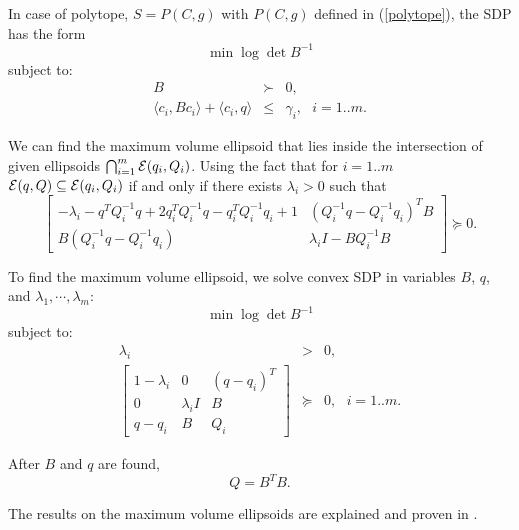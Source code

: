 In case of polytope, $S=P(C,g)$ with $P(C,g)$ defined in (\ref{polytope}),
the SDP has the form
\[ \min \log \det B^{-1} \]
subject to:
\begin{eqnarray*}
B & \succ & 0,\\
\langle c_i, Bc_i\rangle + \langle c_i, q\rangle & \leq & \gamma_i,
~~~ i=1..m.
\end{eqnarray*}

We can find the maximum volume ellipsoid that lies inside the intersection
of given ellipsoids $\bigcap_{i=1}^m\EE(q_i,Q_i)$.
Using the fact that for $i=1..m$ $\EE(q,Q)\subseteq\EE(q_i,Q_i)$ if and only
if there exists $\lambda_i>0$ such that
\[
\left[\begin{array}{cc}
-\lambda_i - q^TQ_i^{-1}q + 2q_i^TQ_i^{-1}q - q_i^TQ_i^{-1}q_i + 1 & (Q_i^{-1}q-Q_i^{-1}q_i)^TB\\
B(Q_i^{-1}q-Q_i^{-1}q_i) & \lambda_iI-BQ_i^{-1}B\end{array}\right] \succeq 0.
\]

To find the maximum volume ellipsoid, we solve convex SDP in variables
$B$, $q$, and $\lambda_1,\cdots,\lambda_m$:
\[ \min \log \det B^{-1} \]
subject to:
\begin{eqnarray*}
\lambda_i & > & 0, \\
\left[\begin{array}{ccc}
1-\lambda_i & 0 & (q - q_i)^T\\
0 & \lambda_iI & B\\
q - q_i & B & Q_i\end{array}\right] & \succeq & 0, ~~~ i=1..m.
\end{eqnarray*}

After $B$ and $q$ are found,
\[ Q = B^TB. \]

The results on the maximum volume ellipsoids are explained
and proven in \cite{boyd04}.
